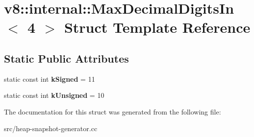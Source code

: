 \hypertarget{structv8_1_1internal_1_1_max_decimal_digits_in_3_014_01_4}{}\section{v8\+:\+:internal\+:\+:Max\+Decimal\+Digits\+In$<$ 4 $>$ Struct Template Reference}
\label{structv8_1_1internal_1_1_max_decimal_digits_in_3_014_01_4}
\subsection*{Static Public Attributes}
\begin{DoxyCompactItemize}
\item 
\hypertarget{structv8_1_1internal_1_1_max_decimal_digits_in_3_014_01_4_a337b121e0c27c67f824a4c8712ba1298}{}static const int {\bfseries k\+Signed} = 11\label{structv8_1_1internal_1_1_max_decimal_digits_in_3_014_01_4_a337b121e0c27c67f824a4c8712ba1298}

\item 
\hypertarget{structv8_1_1internal_1_1_max_decimal_digits_in_3_014_01_4_a9d173ab24eb5214a977edd4832757639}{}static const int {\bfseries k\+Unsigned} = 10\label{structv8_1_1internal_1_1_max_decimal_digits_in_3_014_01_4_a9d173ab24eb5214a977edd4832757639}

\end{DoxyCompactItemize}


The documentation for this struct was generated from the following file\+:\begin{DoxyCompactItemize}
\item 
src/heap-\/snapshot-\/generator.\+cc\end{DoxyCompactItemize}
